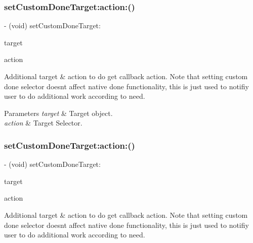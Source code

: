 \subsubsection{\texorpdfstring{set\+Custom\+Done\+Target\+:action\+:()}{setCustomDoneTarget:action:()}\hspace{0.1cm}{\footnotesize\ttfamily [2/3]}}
{\footnotesize\ttfamily -\/ (void) set\+Custom\+Done\+Target\+: \begin{DoxyParamCaption}\item[{(nullable id)}]{target }\item[{action:(nullable S\+EL)}]{action }\end{DoxyParamCaption}}

Additional target \& action to do get callback action. Note that setting custom {\ttfamily done} selector doesn\textquotesingle{}t affect native {\ttfamily done} functionality, this is just used to notifiy user to do additional work according to need.


\begin{DoxyParams}{Parameters}
{\em target} & Target object. \\
\hline
{\em action} & Target Selector. \\
\hline
\end{DoxyParams}
\mbox{\label{category_u_i_view_07_i_q_toolbar_addition_08_ae58dae661619a3fb91490e952851a0e6}} 
\subsubsection{\texorpdfstring{set\+Custom\+Done\+Target\+:action\+:()}{setCustomDoneTarget:action:()}\hspace{0.1cm}{\footnotesize\ttfamily [3/3]}}
{\footnotesize\ttfamily -\/ (void) set\+Custom\+Done\+Target\+: \begin{DoxyParamCaption}\item[{(nullable id)}]{target }\item[{action:(nullable S\+EL)}]{action }\end{DoxyParamCaption}}

Additional target \& action to do get callback action. Note that setting custom {\ttfamily done} selector doesn\textquotesingle{}t affect native {\ttfamily done} functionality, this is just used to notifiy user to do additional work according to need.


